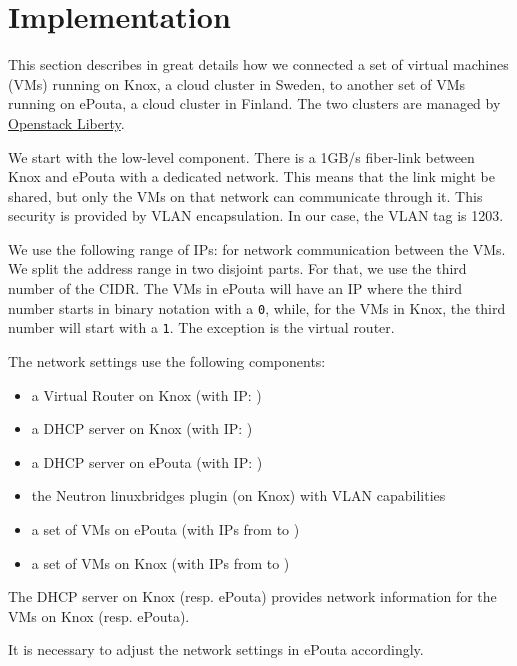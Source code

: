 \section{Implementation}
\label{section:implementation}


This section describes in great details how we connected a set of
virtual machines (VMs) running on Knox, a cloud cluster in Sweden, to
another set of VMs running on ePouta, a cloud cluster in Finland. The
two clusters are managed by
\href{http://docs.openstack.org/liberty/install-guide-ubuntu/}{Openstack
  Liberty}.

We start with the low-level component. There is a 1GB/s fiber-link
between Knox and ePouta with a dedicated network. This means that the
link might be shared, but only the VMs on that network can communicate
through it. This security is provided by VLAN encapsulation. In our
case, the VLAN tag is 1203.

We use the following range of IPs:  for network
communication between the VMs. We split the address range in two
disjoint parts. For that, we use the third number of the
 CIDR. The VMs in ePouta will have an IP where the
third number starts in binary notation with a \texttt{0}, while, for the
VMs in Knox, the third number will start with a \texttt{1}. The
exception is the virtual router.

The network settings use the following components:
\begin{itemize}
\item a Virtual Router on Knox (with IP: )
\item a DHCP server on Knox (with IP: )
\item a DHCP server on ePouta (with IP: )
\item the Neutron linuxbridges plugin (on Knox) with VLAN capabilities
\item a set of VMs on ePouta (with IPs from  to
  )
\item a set of VMs on Knox (with IPs from  to
  )
\end{itemize}

The DHCP server on Knox (resp. ePouta) provides network information for
the VMs on Knox (resp. ePouta).

It is necessary to adjust the network settings in ePouta accordingly.

